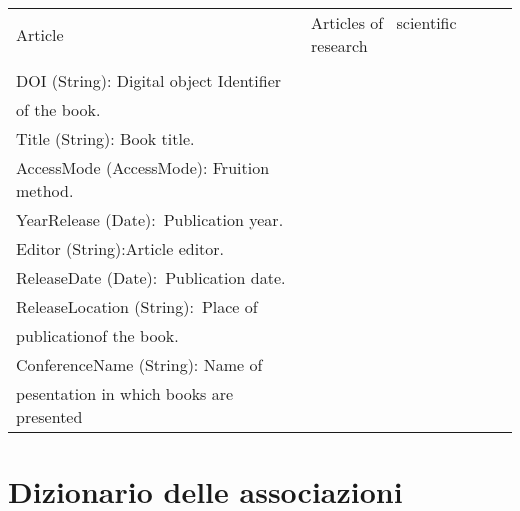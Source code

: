 \begin{longtable}{l|l|l}
Article  & \textcolor[rgb]{0.125,0.129,0.141}{Articles of~ scientific research}                                                                                       & \begin{tabular}[c]{@{}l@{}}\\\\DOI (String): Digital object Identifier \\of the book.\\Title (String): Book title.\\AccessMode (AccessMode): Fruition method.\\YearRelease (Date):~\textcolor[rgb]{0.125,0.129,0.141}{Publication year.}\\Editor (String):\textcolor[rgb]{0.125,0.129,0.141}{Article editor.}\\ReleaseDate (Date):~\textcolor[rgb]{0.125,0.129,0.141}{Publication date.}\\ReleaseLocation (String):~\textcolor[rgb]{0.125,0.129,0.141}{Place of}\\\textcolor[rgb]{0.125,0.129,0.141}{publication}\textcolor[rgb]{0.125,0.129,0.141}{of the book.}\\ConferenceName (String): Name of \\pesentation in which books are presented\textcolor[rgb]{0.125,0.129,0.141}{}\end{tabular}                                                                                                                                                                                                                                                                                                                                                                                                                                                                                                                                                                                                                                      \\
\hline
\end{longtable}




    
    \section{Dizionario delle associazioni}
